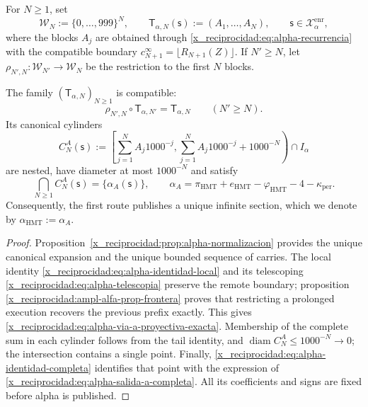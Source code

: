 For \(N\geq1\), set
\[
 \mathcal W_N:=\{0,\ldots,999\}^{N},
 \qquad
 \mathsf T_{\alpha,N}(\mathsf s):=(A_1,\ldots,A_N),
 \qquad \mathsf s\in\mathcal X_{\alpha}^{\mathrm{enr}},
\]
where the blocks \(A_j\) are obtained through \eqref{x_reciprocidad:eq:alpha-recurrencia} with the compatible boundary \(c_{N+1}^{\infty}=\lfloor R_{N+1}(Z)\rfloor\). If \(N'\geq N\), let \(\rho_{N',N}:\mathcal W_{N'}\to\mathcal W_N\) be the restriction to the first \(N\) blocks.

\begin{theorem}
\label{x_reciprocidad:thm:alpha-salida-dodecafasica-completa}
The family \((\mathsf T_{\alpha,N})_{N\geq1}\) is compatible:
\begin{equation}
 \rho_{N',N}\circ\mathsf T_{\alpha,N'}
 =\mathsf T_{\alpha,N}
 \qquad(N'\geq N).
 \label{x_reciprocidad:eq:alpha-via-a-proyectiva-exacta}
\end{equation}
Its canonical cylinders
\begin{equation}
 C_N^A(\mathsf s):=
 \left[
  \sum_{j=1}^{N}A_j1000^{-j},
  \sum_{j=1}^{N}A_j1000^{-j}+1000^{-N}
 \right)\cap I_\alpha
 \label{x_reciprocidad:eq:alpha-cilindros-via-a-exactos}
\end{equation}
are nested, have diameter at most \(1000^{-N}\) and satisfy
\begin{equation}
 \bigcap_{N\geq1}C_N^A(\mathsf s)
 =\{\alpha_A(\mathsf s)\},
 \qquad
 \alpha_A
 =\pi_{\mathrm{HMT}}+e_{\mathrm{HMT}}-\varphi_{\mathrm{HMT}}
  -4-\kappa_{\mathrm{per}}.
 \label{x_reciprocidad:eq:alpha-salida-a-completa}
\end{equation}
Consequently, the first route publishes a unique infinite section, which
we denote by \(\alpha_{\mathrm{HMT}}:=\alpha_A\).
\end{theorem}

\begin{proof}
Proposition~\ref{x_reciprocidad:prop:alpha-normalizacion} provides the unique canonical
expansion and the unique bounded sequence of carries. The local identity
\eqref{x_reciprocidad:eq:alpha-identidad-local} and its telescoping
\eqref{x_reciprocidad:eq:alpha-telescopia} preserve the remote boundary; proposition
\ref{x_reciprocidad:ampl-alfa-prop-frontera} proves that restricting a prolonged execution
recovers the previous prefix exactly. This gives
\eqref{x_reciprocidad:eq:alpha-via-a-proyectiva-exacta}. Membership of the complete sum
in each cylinder follows from the tail identity, and
\(\operatorname{diam}C_N^A\leq1000^{-N}\to0\); the intersection contains a
single point. Finally, \eqref{x_reciprocidad:eq:alpha-identidad-completa} identifies that
point with the expression of \eqref{x_reciprocidad:eq:alpha-salida-a-completa}. All its
coefficients and signs are fixed before alpha is published.
\end{proof}

